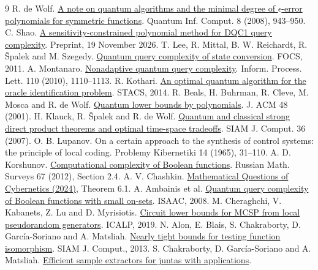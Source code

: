 \documentclass[11pt]{article}
\begin{document}
\begin{thebibliography}{9}
 R. de Wolf. \href{https://arxiv.org/abs/0802.1816}{A note on quantum algorithms and the minimal degree of $\epsilon$-error polynomials for symmetric functions}. Quantum Inf. Comput. 8 (2008), 943--950.
 C. Shao. \href{https://arxiv.org/abs/2611.26231}{A sensitivity-constrained polynomial method for DQC1 query complexity}. Preprint, 19 November 2026.
 T. Lee, R. Mittal, B. W. Reichardt, R. \v{S}palek and M. Szegedy. \href{https://arxiv.org/abs/1011.3020}{Quantum query complexity of state conversion}. FOCS, 2011.
 A. Montanaro. \href{https://arxiv.org/abs/1001.0018}{Nonadaptive quantum query complexity}. Inform. Process. Lett. 110 (2010), 1110--1113.
 R. Kothari. \href{https://doi.org/10.4230/LIPIcs.STACS.2014.482}{An optimal quantum algorithm for the oracle identification problem}. STACS, 2014.
 R. Beals, H. Buhrman, R. Cleve, M. Mosca and R. de Wolf. \href{https://arxiv.org/abs/quant-ph/9802049}{Quantum lower bounds by polynomials}. J. ACM 48 (2001).
 H. Klauck, R. \v{S}palek and R. de Wolf. \href{https://homepages.cwi.nl/~rdewolf/publ/qc/ksw-sicomp.pdf}{Quantum and classical strong direct product theorems and optimal time-space tradeoffs}. SIAM J. Comput. 36 (2007).
 O. B. Lupanov. On a certain approach to the synthesis of control systems: the principle of local coding. Problemy Kibernetiki 14 (1965), 31--110.
 A. D. Korshunov. \href{https://www.mathnet.ru/eng/rm9459}{Computational complexity of Boolean functions}. Russian Math. Surveys 67 (2012), Section 2.4.
 A. V. Chashkin. \href{https://keldysh.ru/papers/2024/mvk/mvk2024_152.pdf}{Mathematical Questions of Cybernetics (2024)}, Theorem 6.1.
 A. Ambainis et al. \href{https://www.kecl.ntt.co.jp/people/tani.seiichiro/pdf/SmallOnSets.pdf}{Quantum query complexity of Boolean functions with small on-sets}. ISAAC, 2008.
 M. Cheraghchi, V. Kabanets, Z. Lu and D. Myrisiotis. \href{https://doi.org/10.4230/LIPIcs.ICALP.2019.39}{Circuit lower bounds for MCSP from local pseudorandom generators}. ICALP, 2019.
 N. Alon, E. Blais, S. Chakraborty, D. Garc\'ia-Soriano and A. Matsliah. \href{https://doi.org/10.1137/110832677}{Nearly tight bounds for testing function isomorphism}. SIAM J. Comput., 2013.
 S. Chakraborty, D. Garc\'ia-Soriano and A. Matsliah. \href{https://www.isical.ac.in/~sourav/papers/implicit.pdf}{Efficient sample extractors for juntas with applications}.
\end{thebibliography}
\end{document}
